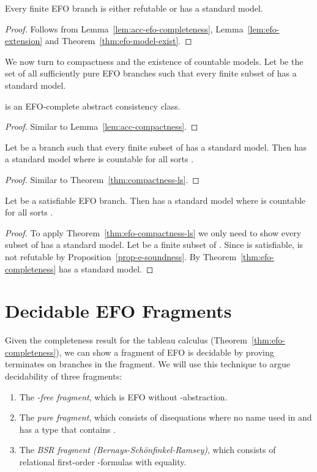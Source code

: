 \begin{thm}
  \label{thm:efo-completeness}
  Every finite EFO branch is either refutable
  or has a standard model.
\end{thm}
\begin{proof}
  Follows from Lemma~\ref{lem:acc-efo-completeness}, Lemma~\ref{lem:efo-extension} and
  Theorem~\ref{thm:efo-model-exist}.
\end{proof}

We now turn to compactness and the existence of countable models.
Let  be the set of all sufficiently pure
EFO branches  such that every finite subset of  has a standard model.

\begin{lem}
  \label{lem:acc-efo-compactness}
   is an EFO-complete abstract consistency
  class.
\end{lem}
\begin{proof}  Similar to Lemma~\ref{lem:acc-compactness}.
\end{proof}

\begin{thm}\label{thm:efo-compactness-ls}
  Let  be a branch such that every finite subset of
   has a standard model.  Then  has a standard model where  is countable for all sorts .
\end{thm}
\begin{proof}  Similar to Theorem~\ref{thm:compactness-ls}.
\end{proof}

\begin{cor}\label{cor:efo-stdsat}
  Let  be a satisfiable EFO branch.
  Then  has a standard model where  is countable for all sorts .
\end{cor}
\begin{proof}
  To apply Theorem~\ref{thm:efo-compactness-ls}
  we only need to show every subset of  has a standard model.
  Let  be a finite subset of .
  Since  is satisfiable,  is not refutable by Proposition~\ref{prop-e-soundness}.
  By Theorem~\ref{thm:efo-completeness}  has a standard model.
\end{proof}

\section{Decidable EFO Fragments}

Given the completeness result for the tableau calculus 
(Theorem~\ref{thm:efo-completeness}),
we can show a fragment of EFO is decidable by proving 
terminates on branches in the fragment.  We will use this technique to argue
decidability of three fragments:
\begin{enumerate}[]
\item The \emph{-free fragment}, which is EFO without -abstraction.
\item The \emph{pure fragment}, which consists of disequations  where no name used in  and  has a type that contains .
\item The \emph{BSR fragment (Bernays-Sch\"onfinkel-Ramsey)}, which consists of relational first-order -formulas with equality.
\end{enumerate}

